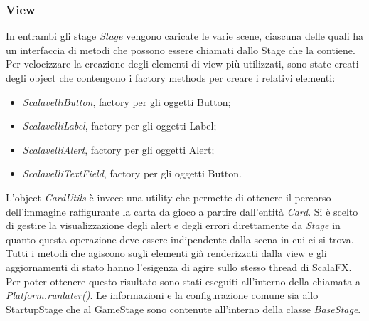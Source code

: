 \subsubsection{View}
In entrambi gli stage \textit{Stage} vengono caricate le varie scene, ciascuna delle quali ha un interfaccia di metodi che possono essere chiamati dallo Stage che la contiene.
\newline \newline
Per velocizzare la creazione degli elementi di view più utilizzati, sono state creati degli object che contengono i factory methods per creare i relativi elementi:
\begin{itemize}
    \item \textit{ScalavelliButton}, factory per gli oggetti Button;
    \item \textit{ScalavelliLabel}, factory per gli oggetti Label;
    \item \textit{ScalavelliAlert}, factory per gli oggetti Alert;
    \item \textit{ScalavelliTextField}, factory per gli oggetti Button.
\end{itemize}
L’object \textit{CardUtils} è invece una utility che permette di ottenere il percorso dell’immagine raffigurante la carta da gioco a partire dall’entità \textit{Card}. \newline \newline
Si è scelto di gestire la visualizzazione degli alert e degli errori direttamente da \textit{Stage} in quanto questa operazione deve essere indipendente dalla scena in cui ci si trova.
Tutti i metodi che agiscono sugli elementi già renderizzati dalla view e gli aggiornamenti di stato hanno l’esigenza di agire sullo stesso thread di ScalaFX. Per poter ottenere questo risultato sono stati eseguiti all’interno della chiamata a \textit{Platform.runlater()}. \newline \newline
Le informazioni e la configurazione comune sia allo StartupStage che al GameStage sono contenute all’interno della classe \textit{BaseStage}.

